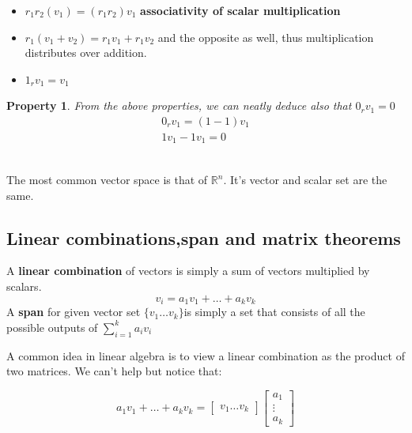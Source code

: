 \documentclass{article}
\newtheorem{property}{Property}
\numberwithin{equation}{subsection}
\begin{document}
\begin{itemize}
    \item $r_{1}r_{2}(v_{1}) = (r_{1}r_{2})v_{1}$  \textbf{associativity of scalar multiplication}
    \item $r_{1}(v_{1}+v_{2}) = r_{1}v_{1}+ r_{1}v_{2}$ and the opposite as well, thus multiplication distributes over addition.
    \item $1_{r}v_{1} = v_{1}$
\end{itemize}

\begin{property}
From the above properties, we can neatly deduce also that $0_{r}v_{1} = 0$
\begin{align*}
    0_{r}v_{1} = (1-1)v_{1}\\
    1v_{1} - 1v_{1} = 0
\end{align*}
\end{property}
\\
The most common vector space is that of $\mathbb{R}^{n}$. It's vector and scalar set are the same. 
\subsection{Linear combinations,span and matrix theorems}

\begin{tcolorbox}
  A \textbf{linear combination} of vectors is simply a sum of vectors multiplied by scalars. 
  \begin{equation*}
      v_{i} = a_{1}v_{1} + \ldots + a_{k}v_{k}
  \end{equation*}
  A \textbf{span} for given vector set $\{v_{1}\ldots v_{k}\}$is simply a set that consists of all the possible outputs of $\sum_{i=1}^{k} a_{i}v_{i}$
\end{tcolorbox}

A common idea in linear algebra is to view a linear combination as the product of two matrices. We can't help but notice that:

\begin{equation*}
    a_{1}v_{1} + \ldots + a_{k}v_{k} = \begin{bmatrix}
        v_{1}  \ldots v_{k}
    \end{bmatrix} \begin{bmatrix}
        a_{1} \\
        \vdots \\
        a_{k}
    \end{bmatrix}
\end{equation*}
\end{document}
